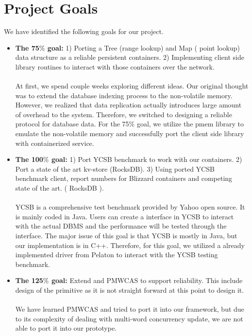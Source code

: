 \section{Project Goals}
We have identified the following goals for our project.
\begin{itemize}
    \item {\bf The 75$\%$ goal:} 1) Porting a Tree (range lookup) and Map ( point lookup) data structure as a reliable persistent containers. 2) Implementing client side library routines to interact with those containers over the network. 
    \\ \\
    At first, we spend couple weeks exploring different ideas. Our original thought was to extend the database indexing process to the non-volatile memory. However, we realized that data replication actually introduces large amount of overhead to the system. Therefore, we switched to designing a reliable protocol for database data. For the 75$\%$ goal, we utilize the pmem library to emulate the non-volatile memory and successfully port the client side library with containerized service.
    \\
    \item {\bf The 100$\%$ goal:} 1) Port YCSB benchmark to work with our containers. 2) Port a state of the art kv-store (RocksDB). 3) Using ported YCSB benchmark client, report numbers for Blizzard containers and competing state of the art. ( RocksDB ).
    \\ \\
    YCSB is a comprehensive test benchmark provided by Yahoo open source. It is mainly coded in Java. Users can create a interface in YCSB to interact with the actual DBMS and the performance will be tested through the interface. The major issue of this goal is that YCSB is mostly in Java, but our implementation is in C++. Therefore, for this goal, we utilized a already implemented driver from Pelaton to interact with the YCSB testing benchmark. 
    \\
    \item {\bf The 125$\%$ goal:} Extend and PMWCAS to support reliability. This include design of the primitive as it is not straight forward at this point to design it.
    \\ \\
    We have learned PMWCAS and tried to port it into our framework, but due to its complexity of dealing with multi-word concurrency update, we are not able to port it into our prototype. 
\end{itemize}



